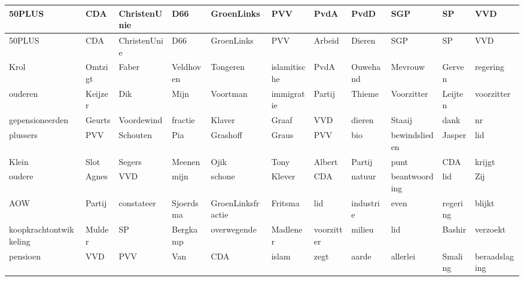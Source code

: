 \begin{tabular}{lllllllllll}
\toprule
                 50PLUS &      CDA &  ChristenUnie &        D66 &         GroenLinks &           PVV &        PvdA &       PvdD &            SGP &        SP &            VVD \\
\midrule
                 50PLUS &      CDA &  ChristenUnie &        D66 &         GroenLinks &           PVV &      Arbeid &     Dieren &            SGP &        SP &            VVD \\
                   Krol &  Omtzigt &         Faber &  Veldhoven &           Tongeren &  islamitische &        PvdA &   Ouwehand &        Mevrouw &    Gerven &       regering \\
                ouderen &  Keijzer &           Dik &       Mijn &           Voortman &    immigratie &      Partij &     Thieme &     Voorzitter &   Leijten &     voorzitter \\
        gepensioneerden &   Geurts &    Voordewind &    fractie &             Klaver &         Graaf &         VVD &     dieren &         Staaij &      dank &             nr \\
               plussers &      PVV &      Schouten &        Pia &           Grashoff &         Graus &         PVV &        bio &  bewindslieden &    Jasper &            lid \\
                  Klein &     Slot &        Segers &     Meenen &               Ojik &          Tony &      Albert &     Partij &           punt &       CDA &         krijgt \\
                 oudere &    Agnes &           VVD &       mijn &             schone &        Klever &         CDA &     natuur &  beantwoording &       lid &            Zij \\
                    AOW &   Partij &    constateer &  Sjoerdsma &  GroenLinksfractie &       Fritsma &         lid &  industrie &           even &  regering &         blijkt \\
 koopkrachtontwikkeling &   Mulder &            SP &   Bergkamp &        overwegende &      Madlener &  voorzitter &     milieu &            lid &    Bashir &       verzoekt \\
               pensioen &      VVD &           PVV &        Van &                CDA &         islam &        zegt &      aarde &       allerlei &   Smaling &  beraadslaging \\
\bottomrule
\end{tabular}
